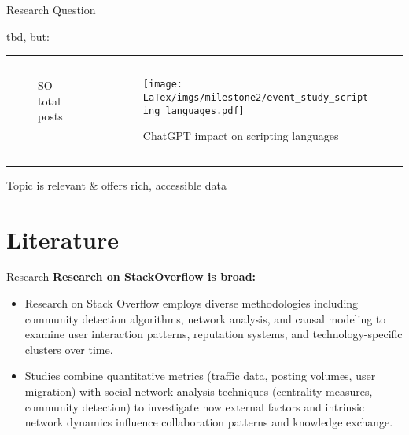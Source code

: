 \documentclass{beamer}
\begin{document}
    \begin{frame}{Research Question}
        \begin{center}
            tbd, but:
        \end{center}
        \rule{\textwidth}{0.4pt}
        \begin{columns}[c]
            \begin{column}{0.475\textwidth}
                \begin{figure}
                    \centering
                    
                    \caption{SO total posts \parencite{celik_fall_2025}}
                    \label{fig:soposts}
                \end{figure}
            \end{column}
            \begin{column}{0.475\textwidth}
                \begin{figure}
                    \centering
                    \texttt{[image: LaTex/imgs/milestone2/event\_study\_scripting\_languages.pdf]}
                    \caption{ChatGPT impact on scripting languages}
                    \label{fig:sdid}
                \end{figure}
            \end{column}
        \end{columns}
        \rule{\textwidth}{0.4pt}
        \begin{center}
             Topic is relevant \& offers rich, accessible data
        \end{center}
    \end{frame}


    \section{Literature}

    \begin{frame}{Research}
        \textbf{Research on StackOverflow is broad:}
        \begin{itemize}
            \item Research on Stack Overflow employs diverse methodologies including community detection algorithms, network analysis, and causal modeling to examine user interaction patterns, reputation systems, and technology-specific clusters over time.
            \item Studies combine quantitative metrics (traffic data, posting volumes, user migration) with social network analysis techniques (centrality measures, community detection) to investigate how external factors and intrinsic network dynamics influence collaboration patterns and knowledge exchange.
        \end{itemize}
    \end{frame}
\end{document}
